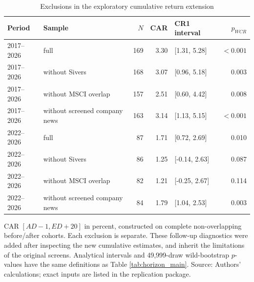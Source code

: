 \begin{table}[!htbp]
\centering
\caption{Exclusions in the exploratory cumulative return extension}\label{tab:horizon_checks}
\small
\setlength{\tabcolsep}{5pt}
\begin{tabular}{llrrlr}
\toprule
Period & Sample & $N$ & CAR & CR1 interval & $p_{WCR}$ \\
\midrule
2017--2026 & full & 169 & 3.30 & [1.31, 5.28] & $<0.001$ \\
2017--2026 & without Sivers & 168 & 3.07 & [0.96, 5.18] & 0.003 \\
2017--2026 & without MSCI overlap & 157 & 2.51 & [0.60, 4.42] & 0.008 \\
2017--2026 & without screened company news & 163 & 3.14 & [1.13, 5.15] & $<0.001$ \\
2022--2026 & full & 87 & 1.71 & [0.72, 2.69] & 0.010 \\
2022--2026 & without Sivers & 86 & 1.25 & [-0.14, 2.63] & 0.087 \\
2022--2026 & without MSCI overlap & 82 & 1.21 & [-0.25, 2.67] & 0.114 \\
2022--2026 & without screened company news & 84 & 1.79 & [1.04, 2.53] & 0.003 \\
\bottomrule
\end{tabular}
\begin{minipage}{\linewidth}\footnotesize\vspace{5pt}
CAR $[AD-1,ED+20]$ in percent, constructed on complete non-overlapping before/after cohorts. Each exclusion is separate. These follow-up diagnostics were added after inspecting the new cumulative estimates, and inherit the limitations of the original screens. Analytical intervals and 49,999-draw wild-bootstrap $p$-values have the same definitions as Table \ref{tab:horizon_main}. Source: Authors' calculations; exact inputs are listed in the replication package.
\end{minipage}
\end{table}
